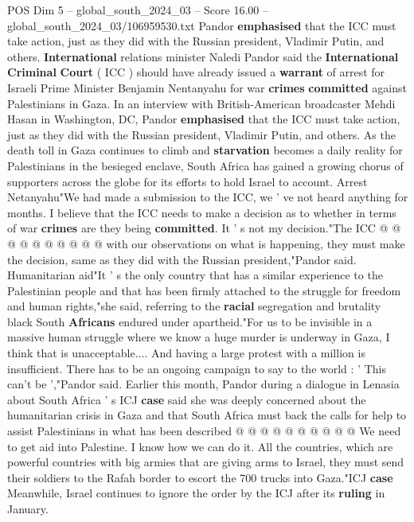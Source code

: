 \begin{textsample}{POS Dim 5 – global\_south\_2024\_03 – Score 16.00 – global\_south\_2024\_03/106959530.txt}  \label{ex:f5_pos_242}
Pandor \textbf{emphasised} that the ICC must take action, just as they did with the Russian president, Vladimir Putin, and others. \textbf{International} relations minister Naledi Pandor said the \textbf{International} \textbf{Criminal} \textbf{Court} ( ICC ) should have already issued a \textbf{warrant} of arrest for Israeli Prime Minister Benjamin Nentanyahu for war \textbf{crimes} \textbf{committed} against Palestinians in Gaza.
In an interview with British-American broadcaster Mehdi Hasan in Washington, DC, Pandor \textbf{emphasised} that the ICC must take action, just as they did with the Russian president, Vladimir Putin, and others.
As the death toll in Gaza continues to climb and \textbf{starvation} becomes a daily reality for Palestinians in the besieged enclave, South Africa has gained a growing chorus of supporters across the globe for its efforts to hold Israel to account.
Arrest Netanyahu"We had made a submission to the ICC, we ' ve not heard anything for months.
I believe that the ICC needs to make a decision as to whether in terms of war \textbf{crimes} are they being \textbf{committed}.
It ' s not my decision."The ICC @ @ @ @ @ @ @ @ @ @ with our observations on what is happening, they must make the decision, same as they did with the Russian president,"Pandor said.
Humanitarian aid"It ' s the only country that has a similar experience to the Palestinian people and that has been firmly attached to the struggle for freedom and human rights,"she said, referring to the \textbf{racial} segregation and brutality black South \textbf{Africans} endured under apartheid."For us to be invisible in a massive human struggle where we know a huge murder is underway in Gaza, I think that is unacceptable....
And having a large protest with a million is insufficient.
There has to be an ongoing campaign to say to the world : ' This can't be ',"Pandor said.
Earlier this month, Pandor during a dialogue in Lenasia about South Africa ' s ICJ \textbf{case} said she was deeply concerned about the humanitarian crisis in Gaza and that South Africa must back the calls for help to assist Palestinians in what has been described @ @ @ @ @ @ @ @ @ @ We need to get aid into Palestine.
I know how we can do it.
All the countries, which are powerful countries with big armies that are giving arms to Israel, they must send their soldiers to the Rafah border to escort the 700 trucks into Gaza."ICJ \textbf{case} Meanwhile, Israel continues to ignore the order by the ICJ after its \textbf{ruling} in January.

\end{textsample}
